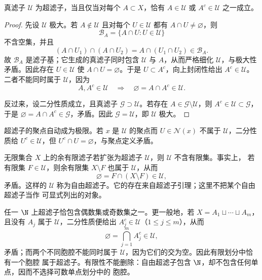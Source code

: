 \begin{proposition}[超滤子二分刻画]\label{proposition:1-1-3-2}
真滤子 \(\mathcal U\) 为超滤子，当且仅当对每个 \(A\subset X\)，恰有 \(A\in\mathcal U\) 或
\(A^c\in\mathcal U\) 之一成立。
\end{proposition}
\begin{proof}
先设 \(\mathcal U\) 极大。若 \(A\notin\mathcal U\) 且对每个 \(U\in\mathcal U\) 都有
\(A\cap U\ne\varnothing\)，则
\[
  \mathcal B_A=\{A\cap U:U\in\mathcal U\}
\]
不含空集，并且
\[
  (A\cap U_1)\cap(A\cap U_2)=A\cap(U_1\cap U_2)\in\mathcal B_A.
\]
故 \(\mathcal B_A\) 是滤子基；它生成的真滤子同时包含 \(\mathcal U\) 与 \(A\)，从而严格细化
\(\mathcal U\)，与极大性矛盾。因此存在 \(U\in\mathcal U\) 使 \(A\cap U=\varnothing\)。于是
\(U\subset A^c\)，向上封闭性给出 \(A^c\in\mathcal U\)。二者不能同时属于 \(\mathcal U\)，因为
\[
  A,A^c\in\mathcal U\quad\Longrightarrow\quad
  \varnothing=A\cap A^c\in\mathcal U.
\]

反过来，设二分性质成立，且真滤子 \(\mathcal G\supset\mathcal U\)。若存在
\(A\in\mathcal G\setminus\mathcal U\)，则 \(A^c\in\mathcal U\subset\mathcal G\)，于是
\(\varnothing=A\cap A^c\in\mathcal G\)，矛盾。因此 \(\mathcal G=\mathcal U\)，即 \(\mathcal U\) 极大。
\end{proof}

\begin{remark}
超滤子的聚点自动成为极限。若 \(x\) 是 \(\mathcal U\) 的聚点而 \(U\in\mathcal N(x)\) 不属于
\(\mathcal U\)，二分性质给 \(U^c\in\mathcal U\)，但 \(U^c\cap U=\varnothing\)，与聚点定义矛盾。
\end{remark}

\begin{example}[自由超滤子]\label{ex:1-1-3-1}
无限集合 \(X\) 上的余有限滤子若扩张为超滤子 \(\mathcal U\)，则 \(\mathcal U\) 不含有限集。事实上，
若有限集 \(F\in\mathcal U\)，则余有限集 \(X\setminus F\) 也属于 \(\mathcal U\)，从而
\[
  \varnothing=F\cap(X\setminus F)\in\mathcal U,
\]
矛盾。这样的 \(\mathcal U\) 称为自由超滤子。它的存在来自超滤子引理；这里不把某个自由超滤子当作
可显式列出的对象。
\end{example}

\begin{example}[有限划分与可数划分]\label{ex:1-1-3-2}
任一 \(\N\) 上超滤子恰包含偶数集或奇数集之一。更一般地，若
\(X=A_1\sqcup\cdots\sqcup A_m\)，且没有 \(A_j\) 属于 \(\mathcal U\)，二分性质便给出
\(A_j^c\in\mathcal U\)（\(1\le j\le m\)），从而
\[
  \varnothing=\bigcap_{j=1}^m A_j^c\in\mathcal U,
\]
矛盾；而两个不同胞腔不能同时属于 \(\mathcal U\)，因为它们的交为空。因此有限划分中恰有一个胞腔
属于超滤子。有限性不能删除：自由超滤子包含 \(\N\)，却不包含任何单点，因而不选择可数单点划分中的
胞腔。
\end{example}

